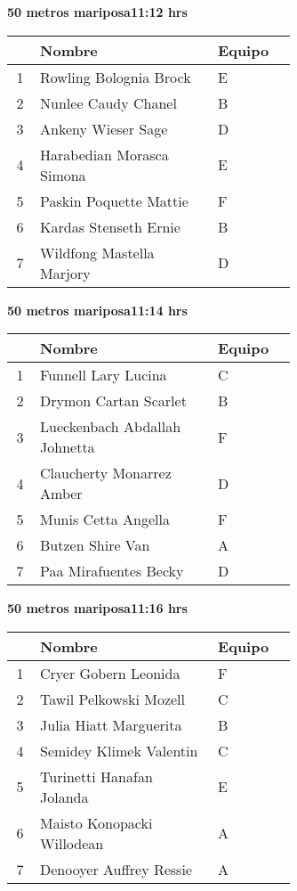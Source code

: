 \begin{minipage}{0.95\linewidth}
\begin{center}
\textbf{
50 metros mariposa\hspace{1cm}11:12 hrs}
\end{center}
\begin{tabular}{cp{0.63\linewidth}l}
\hline
& \textbf{Nombre} & \textbf{Equipo} \\ \hline
1 & Rowling Bolognia Brock & E \\ 
2 & Nunlee Caudy Chanel & B \\ 
3 & Ankeny Wieser Sage & D \\ 
4 & Harabedian Morasca Simona & E \\ 
5 & Paskin Poquette Mattie & F \\ 
6 & Kardas Stenseth Ernie & B \\ 
7 & Wildfong Mastella Marjory & D \\ 
\end{tabular}
\end{minipage}
\begin{minipage}{0.95\linewidth}
\begin{center}
\textbf{
50 metros mariposa\hspace{1cm}11:14 hrs}
\end{center}
\begin{tabular}{cp{0.63\linewidth}l}
\hline
& \textbf{Nombre} & \textbf{Equipo} \\ \hline
1 & Funnell Lary Lucina & C \\ 
2 & Drymon Cartan Scarlet & B \\ 
3 & Lueckenbach Abdallah Johnetta & F \\ 
4 & Claucherty Monarrez Amber & D \\ 
5 & Munis Cetta Angella & F \\ 
6 & Butzen Shire Van & A \\ 
7 & Paa Mirafuentes Becky & D \\ 
\end{tabular}
\end{minipage}
\begin{minipage}{0.95\linewidth}
\begin{center}
\textbf{
50 metros mariposa\hspace{1cm}11:16 hrs}
\end{center}
\begin{tabular}{cp{0.63\linewidth}l}
\hline
& \textbf{Nombre} & \textbf{Equipo} \\ \hline
1 & Cryer Gobern Leonida & F \\ 
2 & Tawil Pelkowski Mozell & C \\ 
3 & Julia Hiatt Marguerita & B \\ 
4 & Semidey Klimek Valentin & C \\ 
5 & Turinetti Hanafan Jolanda & E \\ 
6 & Maisto Konopacki Willodean & A \\ 
7 & Denooyer Auffrey Ressie & A \\ 
\end{tabular}
\end{minipage}
